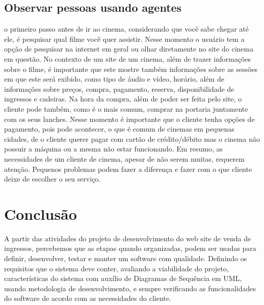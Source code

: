 \documentclass[12pt]{article}
\begin{document}
     \subsection{Observar pessoas usando agentes}
        o primeiro passo antes de ir ao cinema, considerando que você sabe chegar até ele, é pesquisar qual filme você quer assistir. Nesse momento o usuário tem a opção de pesquisar na internet em geral ou olhar diretamente no site do cinema em questão. 
        No contexto de um site de um cinema, além de trazer informações sobre o filme, é importante que este mostre também informações sobre as sessões em que este será exibido, como tipo de áudio e vídeo, horário, além de informações sobre preços, compra,  pagamento, reserva, disponibilidade de ingressos e cadeiras.
        Na hora da compra, além de poder ser feita pelo site, o cliente pode também, como é o mais comum, comprar na portaria juntamente com os seus lanches. Nesse momento é importante que o cliente tenha opções de pagamento, pois pode acontecer, o que é comum de cinemas em pequenas cidades, de o cliente querer pagar com cartão de crédito/débito mas o cinema não possuir a máquina ou a mesma não estar funcionando.
        Em resumo, as necessidades de um cliente de cinema, apesar de não serem muitas, requerem atenção. Pequenos problemas podem fazer a diferença e fazer com o que cliente deixe de escolher o seu serviço.
     
\section{Conclusão}
A partir das atividades do projeto de desenvolvimento do web site de venda de ingressos, percebemos que as etapas quando organizadas, podem ser usadas para definir, desenvolver, testar e manter um software com qualidade. Definindo os requisitos que o sistema deve conter, avaliando a viabilidade do projeto, características do sistema com auxílio de Diagramas de Sequência em UML, usando metodologia de desenvolvimento, e sempre verificando as funcionalidades do software de acordo com as necessidades do cliente.

\nocite{*}


\end{document}
